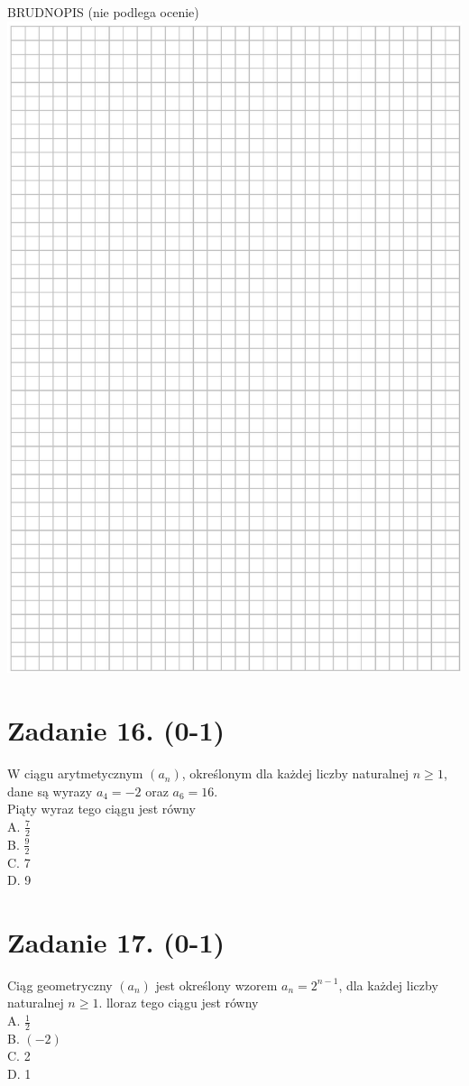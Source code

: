 \documentclass[10pt]{article}
\begin{document}
BRUDNOPIS (nie podlega ocenie)\\
\includegraphics[max width=\textwidth, center]{2024_11_21_0a35d272448d5080a489g-13}

\section*{Zadanie 16. (0-1)}
W ciągu arytmetycznym \(\left(a_{n}\right)\), określonym dla każdej liczby naturalnej \(n \geq 1\), dane są wyrazy \(a_{4}=-2\) oraz \(a_{6}=16\).\\
Piąty wyraz tego ciągu jest równy\\
A. \(\frac{7}{2}\)\\
B. \(\frac{9}{2}\)\\
C. 7\\
D. 9

\section*{Zadanie 17. (0-1)}
Ciąg geometryczny \(\left(a_{n}\right)\) jest określony wzorem \(a_{n}=2^{n-1}\), dla każdej liczby naturalnej \(n \geq 1\). lloraz tego ciągu jest równy\\
A. \(\frac{1}{2}\)\\
B. \((-2)\)\\
C. 2\\
D. 1
\end{document}
